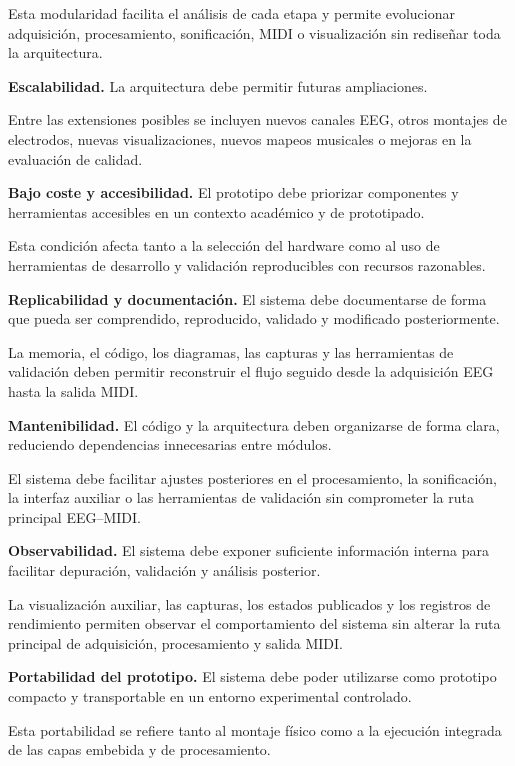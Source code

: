 \documentclass[../main.tex]{subfiles}
\begin{document}
\begin{description}[leftmargin=!,labelwidth=2.2cm]
    Esta modularidad facilita el análisis de cada etapa y permite evolucionar adquisición, procesamiento, sonificación, MIDI o visualización sin rediseñar toda la arquitectura.

    \item[RNF-6] \textbf{Escalabilidad.} La arquitectura debe permitir futuras ampliaciones.

    Entre las extensiones posibles se incluyen nuevos canales EEG, otros montajes de electrodos, nuevas visualizaciones, nuevos mapeos musicales o mejoras en la evaluación de calidad.

    \item[RNF-7] \textbf{Bajo coste y accesibilidad.} El prototipo debe priorizar componentes y herramientas accesibles en un contexto académico y de prototipado.

    Esta condición afecta tanto a la selección del hardware como al uso de herramientas de desarrollo y validación reproducibles con recursos razonables.

    \item[RNF-8] \textbf{Replicabilidad y documentación.} El sistema debe documentarse de forma que pueda ser comprendido, reproducido, validado y modificado posteriormente.

    La memoria, el código, los diagramas, las capturas y las herramientas de validación deben permitir reconstruir el flujo seguido desde la adquisición EEG hasta la salida MIDI.

    \item[RNF-9] \textbf{Mantenibilidad.} El código y la arquitectura deben organizarse de forma clara, reduciendo dependencias innecesarias entre módulos.

    El sistema debe facilitar ajustes posteriores en el procesamiento, la sonificación, la interfaz auxiliar o las herramientas de validación sin comprometer la ruta principal EEG--MIDI.

    \item[RNF-10] \textbf{Observabilidad.} El sistema debe exponer suficiente información interna para facilitar depuración, validación y análisis posterior.

    La visualización auxiliar, las capturas, los estados publicados y los registros de rendimiento permiten observar el comportamiento del sistema sin alterar la ruta principal de adquisición, procesamiento y salida MIDI.

    \item[RNF-11] \textbf{Portabilidad del prototipo.} El sistema debe poder utilizarse como prototipo compacto y transportable en un entorno experimental controlado.

    Esta portabilidad se refiere tanto al montaje físico como a la ejecución integrada de las capas embebida y de procesamiento.

\end{description}
\end{document}
